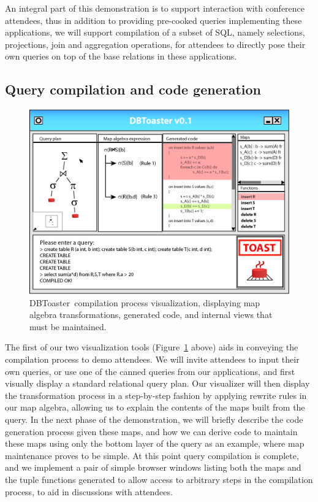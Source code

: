 \documentclass{vldb}
\newcommand{\comment}[1]{}
\newcommand{\compiler}{DBToaster}
\begin{document}
An integral part of this demonstration is to support interaction with conference
attendees, thus in addition to providing pre-cooked queries implementing these
applications, we will support compilation of a subset of SQL, namely selections,
projections, join and aggregation operations, for attendees to directly pose
their own queries on top of the base relations in these applications.




\subsection{Query compilation and code generation}

\begin{figure}
\begin{center}
\includegraphics[scale=0.47]{figures/gui1}
\end{center}
\caption{\compiler\ compilation process visualization, displaying map algebra
transformations, generated code, and internal views that must be maintained.}
\label{fig:compilegui}
\end{figure}

The first of our two visualization tools (Figure~\ref{fig:compilegui} above) aids
in conveying the compilation process to demo attendees. We will invite attendees
to input their own queries, or use one of the canned queries from our
applications, and first visually display a standard relational query plan. Our
visualizer will then display the transformation process in a step-by-step fashion
by applying rewrite rules in our map algebra, allowing us to explain the contents
of the maps built from the query. In the next phase of the demonstration, we will
briefly describe the code generation process given these maps, and how we can
derive code to maintain these maps using only the bottom layer of the query as an
example, where map maintenance proves to be simple. At this point query
compilation is complete, and we implement a pair of simple browser windows
listing both the maps and the tuple functions generated to allow access to
arbitrary steps in the compilation process, to aid in discussions with attendees.
\comment{
Depending on the
demonstration progress, we may additionally include an example of a
JIT-compilation of the example query to demonstrate the potential for a limited
degree of adaptivity during query execution.
}
\end{document}

